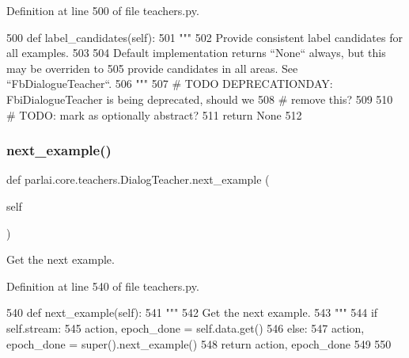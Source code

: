 Definition at line 500 of file teachers.\+py.


\begin{DoxyCode}
500     \textcolor{keyword}{def }label\_candidates(self):
501         \textcolor{stringliteral}{"""}
502 \textcolor{stringliteral}{        Provide consistent label candidates for all examples.}
503 \textcolor{stringliteral}{}
504 \textcolor{stringliteral}{        Default implementation returns ``None`` always, but this may be overriden to}
505 \textcolor{stringliteral}{        provide candidates in all areas. See ``FbDialogueTeacher``.}
506 \textcolor{stringliteral}{        """}
507         \textcolor{comment}{# TODO DEPRECATIONDAY: FbiDialogueTeacher is being deprecated, should we}
508         \textcolor{comment}{# remove this?}
509 
510         \textcolor{comment}{# TODO: mark as optionally abstract?}
511         \textcolor{keywordflow}{return} \textcolor{keywordtype}{None}
512 
\end{DoxyCode}
\mbox{\label{classparlai_1_1core_1_1teachers_1_1DialogTeacher_a738c4571db2fee7ce3ab01072f10ed49}} 
\subsubsection{\texorpdfstring{next\+\_\+example()}{next\_example()}}
{\footnotesize\ttfamily def parlai.\+core.\+teachers.\+Dialog\+Teacher.\+next\+\_\+example (\begin{DoxyParamCaption}\item[{}]{self }\end{DoxyParamCaption})}

\begin{DoxyVerb}Get the next example.
\end{DoxyVerb}
 

Definition at line 540 of file teachers.\+py.


\begin{DoxyCode}
540     \textcolor{keyword}{def }next\_example(self):
541         \textcolor{stringliteral}{"""}
542 \textcolor{stringliteral}{        Get the next example.}
543 \textcolor{stringliteral}{        """}
544         \textcolor{keywordflow}{if} self.stream:
545             action, epoch\_done = self.data.get()
546         \textcolor{keywordflow}{else}:
547             action, epoch\_done = super().next\_example()
548         \textcolor{keywordflow}{return} action, epoch\_done
549 
550 
\end{DoxyCode}
\mbox{\label{classparlai_1_1core_1_1teachers_1_1DialogTeacher_af1e90a07058dc489c45280f0982e21be}} 

